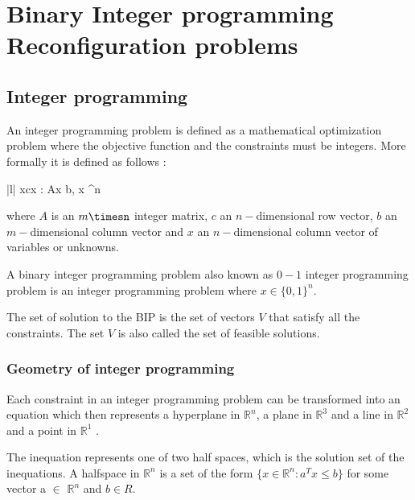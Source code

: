 \section{Binary Integer programming Reconfiguration problems}
\label{sec:BIP}
\subsection{Integer programming}
\begin{defn}
An integer programming problem is defined as a mathematical optimization
problem where the objective function and the constraints must be integers. 
More formally it is defined as follows :
\begin{center}
    \begin{maxi!}|l|
	  {x}{cx : Ax \leq b, x \in {}^{n}}{}{}
    \end{maxi!}
\end{center}
where $A$ is an $m\timesn$ integer matrix, $c$ an $n-$dimensional row vector, $b$ an $m-$dimensional column vector and $x$ an $n-$dimensional column vector of variables or unknowns. 
\end{defn}

\begin{defn}
A binary integer programming problem also known as $0-1$ integer programming problem is an integer programming problem where $x \in \{0,1\}^{n}$. 
\end{defn}

\begin{defn}
The set of solution to the BIP is the set of vectors $V$ that satisfy all the constraints. The set $V$ is also called the set of feasible solutions. 
\end{defn}

\subsubsection{Geometry of integer programming}
\begin{defn}
Each constraint in an integer programming problem can be transformed into an equation which then represents a hyperplane in $\mathbb{R}^{n}$, a plane in $\mathbb{R}^{3}$ and a line in $\mathbb{R}^{2}$ and a point in $\mathbb{R}^{1}$ .
\end{defn}

\begin{defn}
The inequation represents one of two half spaces, which is the solution set of the inequations. A halfspace in $\mathbb{R}^{n}$ is a set of the form $\{x \in \mathbb{R}^{n} : a^{T}x \leq b\}$ for some vector a $\in$ $\mathbb{R}^{n}$ and $b \in R$.
\end{defn}

